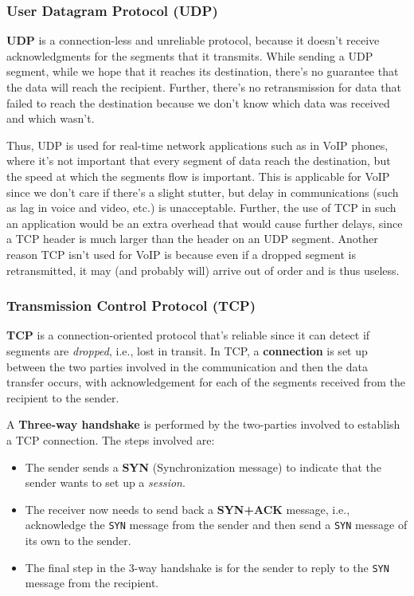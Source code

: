 \subsubsection{User Datagram Protocol (UDP)}
\textbf{UDP} is a connection-less and unreliable protocol, because it doesn't receive acknowledgments for the segments that it transmits. While sending a UDP segment, while we hope that it reaches its destination, there's no guarantee that the data will reach the recipient. Further, there's no retransmission for data that failed to reach the destination because we don't know which data was received and which wasn't. 

Thus, UDP is used for real-time network applications such as in VoIP phones, where it's not important that every segment of data reach the destination, but the speed at which the segments flow is important. This is applicable for VoIP since we don't care if there's a slight stutter, but delay in communications (such as lag in voice and video, etc.) is unacceptable. Further, the use of TCP in such an application would be an extra overhead that would cause further delays, since a TCP header is much larger than the header on an UDP segment. Another reason TCP isn't used for VoIP is because even if a dropped segment is retransmitted, it may (and probably will) arrive out of order and is thus useless. 

\subsubsection{Transmission Control Protocol (TCP)}
\textbf{TCP} is a connection-oriented protocol that's reliable since it can detect if segments are \textit{dropped}, i.e., lost in transit. In TCP, a \textbf{connection} is set up between the two parties involved in the communication and then the data transfer occurs, with acknowledgement for each of the segments received from the recipient to the sender. 

A \textbf{Three-way handshake} is performed by the two-parties involved to establish a TCP connection. The steps involved are:

\begin{itemize}
	\item The sender sends a \textbf{SYN} (Synchronization message) to indicate that the sender wants to set up a \textit{session}. 
	\item The receiver now needs to send back a \textbf{SYN+ACK} message, i.e., acknowledge the \verb|SYN| message from the sender and then send a \verb|SYN| message of its own to the sender. 
	\item The final step in the 3-way handshake is for the sender to reply to the \verb|SYN| message from the recipient. 
\end{itemize}

